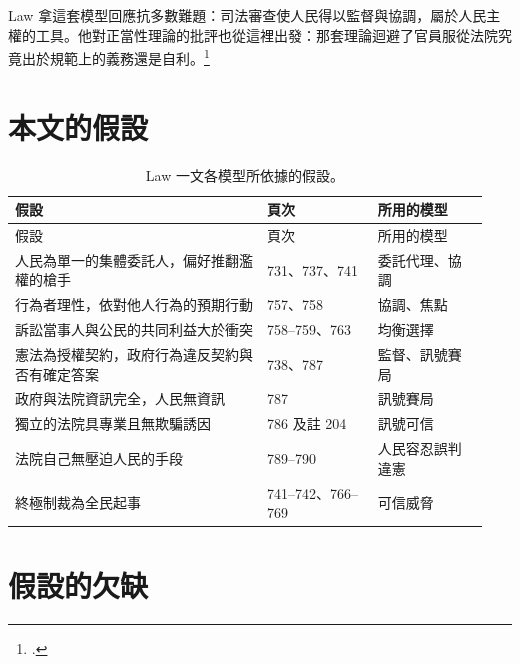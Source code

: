 Law 拿這套模型回應抗多數難題：司法審查使人民得以監督與協調，屬於人民主權的工具。他對正當性理論的批評也從這裡出發：那套理論迴避了官員服從法院究竟出於規範上的義務還是自利。\footcite[786, 793]{law2009}

\section{本文的假設}
\label{sec:20_game-2}

\begin{longtable}{@{}L{0.50\linewidth}L{0.22\linewidth}L{0.22\linewidth}@{}}
\caption{Law 一文各模型所依據的假設。}\\
\toprule
假設 & 頁次 & 所用的模型 \\
\midrule
\endfirsthead
\toprule
假設 & 頁次 & 所用的模型 \\
\midrule
\endhead
人民為單一的集體委託人，偏好推翻濫權的槍手 & 731、737、741 & 委託代理、協調 \\
行為者理性，依對他人行為的預期行動 & 757、758 & 協調、焦點 \\
訴訟當事人與公民的共同利益大於衝突 & 758--759、763 & 均衡選擇 \\
憲法為授權契約，政府行為違反契約與否有確定答案 & 738、787 & 監督、訊號賽局 \\
政府與法院資訊完全，人民無資訊 & 787 & 訊號賽局 \\
獨立的法院具專業且無欺騙誘因 & 786 及註 204 & 訊號可信 \\
法院自己無壓迫人民的手段 & 789--790 & 人民容忍誤判違憲 \\
終極制裁為全民起事 & 741--742、766--769 & 可信威脅 \\
\bottomrule
\end{longtable}

\section{假設的欠缺}
\label{sec:20_game-3}

